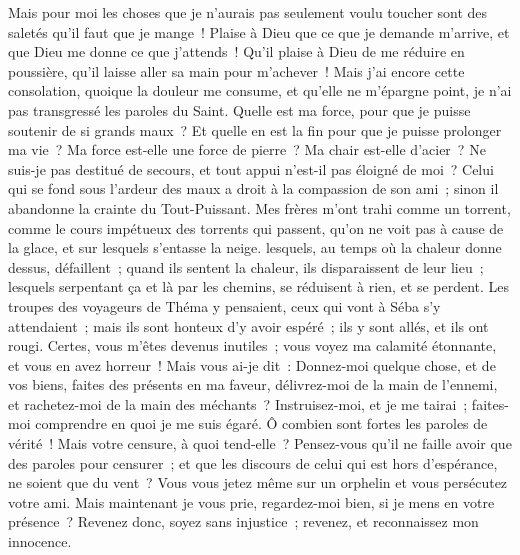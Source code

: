 \begin{multicols}{2}
Mais pour moi les choses que je n'aurais pas seulement voulu toucher sont des saletés qu'il faut que je mange~!
Plaise à Dieu que ce que je demande m'arrive, et que Dieu me donne ce que j'attends~!
Qu'il plaise à Dieu de me réduire en poussière, qu'il laisse aller sa main pour m'achever~!
Mais j'ai encore cette consolation, quoique la douleur me consume, et qu'elle ne m'épargne point, je n'ai pas transgressé les paroles du Saint.
Quelle est ma force, pour que je puisse soutenir de si grands maux~? Et quelle en est la fin pour que je puisse prolonger ma vie~? 
Ma force est-elle une force de pierre~? Ma chair est-elle d'acier~?
Ne suis-je pas destitué de secours, et tout appui n'est-il pas éloigné de moi~?
Celui qui se fond sous l'ardeur des maux a droit à la compassion de son ami~; sinon il abandonne la crainte du Tout-Puissant.
Mes frères m'ont trahi comme un torrent, comme le cours impétueux des torrents qui passent,
qu'on ne voit pas à cause de la glace, et sur lesquels s'entasse la neige.
lesquels, au temps où la chaleur donne dessus, défaillent~; quand ils sentent la chaleur, ils disparaissent de leur lieu~;
lesquels serpentant ça et là par les chemins, se réduisent à rien, et se perdent.
Les troupes des voyageurs de Théma y pensaient, ceux qui vont à Séba s'y attendaient~;
mais ils sont honteux d'y avoir espéré~; ils y sont allés, et ils ont rougi.
Certes, vous m'êtes devenus inutiles~; vous voyez ma calamité étonnante, et vous en avez horreur~!
Mais vous ai-je dit~: Donnez-moi quelque chose, et de vos biens, faites des présents en ma faveur,
délivrez-moi de la main de l'ennemi, et rachetez-moi de la main des méchants~?
Instruisez-moi, et je me tairai~; faites-moi comprendre en quoi je me suis égaré.
Ô combien sont fortes les paroles de vérité~! Mais votre censure, à quoi tend-elle~?
Pensez-vous qu'il ne faille avoir que des paroles pour censurer~; et que les discours de celui qui est hors d'espérance, ne soient que du vent~?
Vous vous jetez même sur un orphelin et vous persécutez votre ami.
Mais maintenant je vous prie, regardez-moi bien, si je mens en votre présence~?
Revenez donc, soyez sans injustice~; revenez, et reconnaissez mon innocence.

\end{multicols}
